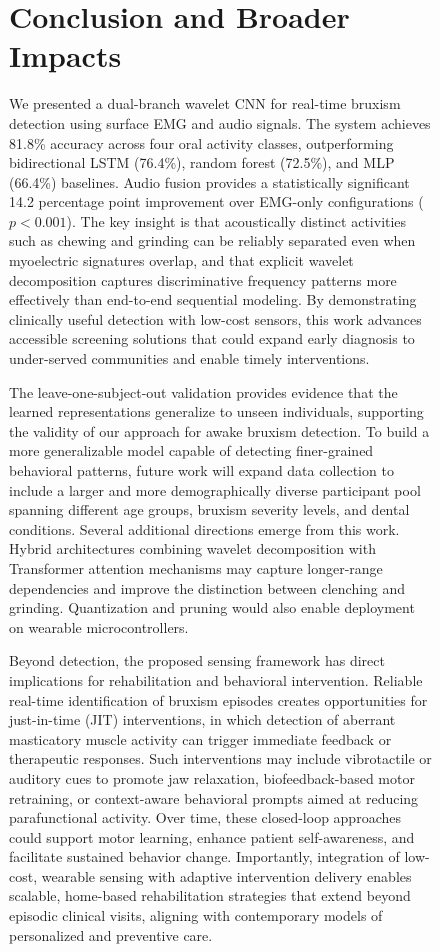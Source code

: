 \documentclass[pdflatex,sn-vancouver-num, iicol]{sn-jnl}
\begin{document}
\begin{figure}[h]
\section{Conclusion and Broader Impacts}


We presented a dual-branch wavelet CNN for real-time bruxism detection using surface EMG and audio signals. The system achieves 81.8\% accuracy across four oral activity classes, outperforming bidirectional LSTM (76.4\%), random forest (72.5\%), and MLP (66.4\%) baselines. Audio fusion provides a statistically significant 14.2 percentage point improvement over EMG-only configurations ($p < 0.001$). The key insight is that acoustically distinct activities such as chewing and grinding can be reliably separated even when myoelectric signatures overlap, and that explicit wavelet decomposition captures discriminative frequency patterns more effectively than end-to-end sequential modeling. By demonstrating clinically useful detection with low-cost sensors, this work advances accessible screening solutions that could expand early diagnosis to under-served communities and enable timely interventions.


The leave-one-subject-out validation provides evidence that the learned representations generalize to unseen individuals, supporting the validity of our approach for awake bruxism detection. To build a more generalizable model capable of detecting finer-grained behavioral patterns, future work will expand data collection to include a larger and more demographically diverse participant pool spanning different age groups, bruxism severity levels, and dental conditions. Several additional directions emerge from this work. Hybrid architectures combining wavelet decomposition with Transformer attention mechanisms may capture longer-range dependencies and improve the distinction between clenching and grinding. Quantization and pruning would also enable deployment on wearable microcontrollers.

Beyond detection, the proposed sensing framework has direct implications for rehabilitation and behavioral intervention. Reliable real-time identification of bruxism episodes creates opportunities for just-in-time (JIT) interventions, in which detection of aberrant masticatory muscle activity can trigger immediate feedback or therapeutic responses. Such interventions may include vibrotactile or auditory cues to promote jaw relaxation, biofeedback-based motor retraining, or context-aware behavioral prompts aimed at reducing parafunctional activity. Over time, these closed-loop approaches could support motor learning, enhance patient self-awareness, and facilitate sustained behavior change. Importantly, integration of low-cost, wearable sensing with adaptive intervention delivery enables scalable, home-based rehabilitation strategies that extend beyond episodic clinical visits, aligning with contemporary models of personalized and preventive care.




\end{figure}
\end{document}
